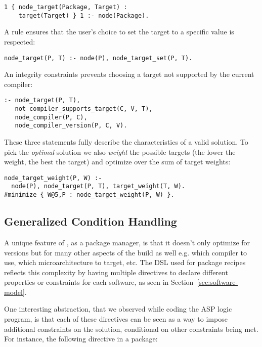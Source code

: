 \begin{verbatim}
1 { node_target(Package, Target) :
    target(Target) } 1 :- node(Package).
\end{verbatim}

A rule ensures that the user's choice to set the target to a specific value is respected:

\begin{verbatim}
node_target(P, T) :- node(P), node_target_set(P, T).
\end{verbatim}

An integrity constraints prevents choosing a target not supported by the current compiler:

\begin{verbatim}
:- node_target(P, T),
   not compiler_supports_target(C, V, T),
   node_compiler(P, C),
   node_compiler_version(P, C, V).
\end{verbatim}

These three statements fully describe the characteristics of a valid solution. To pick
the \emph{optimal} solution we also \emph{weight} the possible targets (the lower the
weight, the best the target) and optimize over the sum of target weights:

\begin{verbatim}
node_target_weight(P, W) :-
  node(P), node_target(P, T), target_weight(T, W).
#minimize { W@5,P : node_target_weight(P, W) }.
\end{verbatim}

\subsection{Generalized Condition Handling}
\label{subsec:generalizedcond}
A unique feature of \spack, as a package manager, is that it doesn't only optimize for
versions but for many other aspects of the build as well e.g. which compiler to use,
which microarchitecture to target, etc. The DSL used for package recipes reflects this
complexity by having multiple directives to declare different properties or constraints
for each software, as seen in Section~\ref{sec:software-model}.

One interesting abstraction, that we observed while coding the ASP logic program, is
that each of these directives can be seen as a way to impose additional constraints on
the solution, conditional on other constraints being met. For instance, the following
directive in a package:

